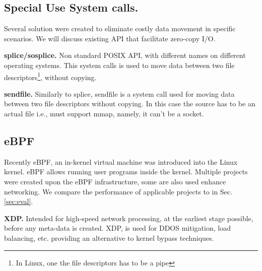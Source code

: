 
\subsection{Special Use System calls.}
Several solution were created to eliminate costly data movement in specific scenarios. We will discuss existing API that facilitate zero-copy I/O.

\noindent\textbf{splice/sosplice\cite{splice,sosplice}.}
Non standard POSIX API, with different names on different operating systems. This system calls is used to move data between two file descriptors\footnote{In Linux, one the file descriptors has to be a pipe}, without copying. 

\noindent\textbf{sendfile\cite{sendfile}.}
Similarly to splice, sendfile is a system call used for moving data between two file descriptors without copying. In this case the source has to be an actual file i.e., must support mmap, namely, it can't be a socket.

\subsection{eBPF}
Recently eBPF\cite{ebpf}, an in-kernel virtual machine was introduced into the Linux kernel. eBPF allows running user programs inside the kernel. Multiple projects\cite{ebpf_2} were created upon the eBPF infrastructure, some are also used enhance networking. We compare the performance of applicable projects to \oursys in Sec. \ref{sec:eval}.

\noindent \textbf{XDP\cite{xdp}.} Intended for high-speed network processing, at the earliest stage possible, before any meta-data is created. XDP, is used for DDOS mitigation, load balancing, etc. providing an alternative to kernel bypass techniques. 


